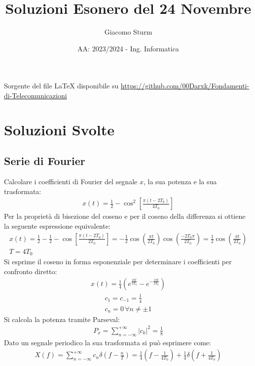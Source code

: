 \documentclass{article}
\title{Soluzioni Esonero del 24 Novembre}
\author{Giacomo Sturm}
\date{AA: 2023/2024 - Ing. Informatica}
\begin{document}

\pagestyle{fancy}
\fancyhead{}\fancyfoot{}
\fancyfoot[C]{\thepage}

\maketitle

\vspace{10mm}

\begin{center}
    Sorgente del file LaTeX disponibile su \url{https://github.com/00Darxk/Fondamenti-di-Telecomunicazioni}
\end{center}

\clearpage

\tableofcontents

\clearpage


\section{Soluzioni Svolte}

\subsection{Serie di Fourier}
Calcolare i coefficienti di Fourier del segnale $x$, la sua potenza e la sua trasformata:
\begin{gather*}
    x(t)=\displaystyle\frac{1}{2}-\cos^2\left[\frac{\pi(t-2T_0)}{4T_0}\right]
\end{gather*}
Per la proprietà di bisezione del coseno e per il coseno della differenza si ottiene la seguente espressione equivalente:
\begin{gather*}
    x(t)=\displaystyle\frac{1}{2}-\frac{1}{2}-\cos\left[\frac{\pi(t-2T_0)}{2T_0}\right]=-\frac{1}{2}\cos\left(\frac{\pi t}{2T_0}\right)\cos\left(\frac{-2T_0\pi}{2T_0}\right)=\frac{1}{2}\cos\left(\frac{\pi t}{2T_0}\right)\\
    T=4T_0
\end{gather*}
Si esprime il coseno in forma esponenziale per determinare i coefficienti per confronto diretto:
\begin{gather*}
    x(t)=\displaystyle\frac{1}{4}\left(e^{\frac{i\pi t}{2T_0}}-e^{-\frac{i\pi t}{2T_0}}\right)
\end{gather*}
\begin{gather}
    c_1=c_{-1}=\displaystyle\frac{1}{4}\\
    c_n=0\,\forall n\neq\pm1
\end{gather}
Si calcola la potenza tramite Parseval:
\begin{gather}
    P_x=\displaystyle\sum_{n=-\infty}^{+\infty}|c_k|^2=\frac{1}{8}
\end{gather}
Dato un segnale periodico la sua trasformata si può esprimere come:
\begin{gather}
    X(f)=\displaystyle\sum_{n=-\infty}^{+\infty}c_n\delta\left(f-\frac{n}{T}\right)=\frac{1}{4}\left(f-\frac{1}{4T_0}\right)+\frac{1}{4}\delta\left(f+\frac{1}{4T_0}\right)
\end{gather}
\end{document}
